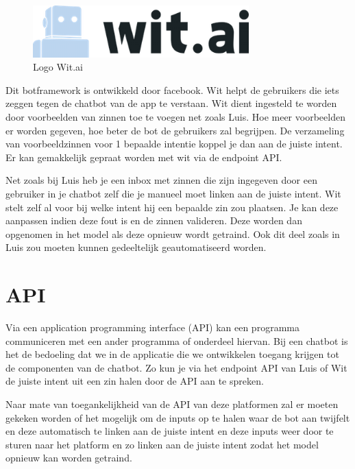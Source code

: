 \begin{figure}[h!]
	\centering
	\includegraphics[height=2cm]{wit.png}
	\caption{Logo Wit.ai ~\autocite{Eva2016}}
	\label{fig:wit}
\end{figure}

Dit botframework is ontwikkeld door facebook. Wit helpt de gebruikers die iets zeggen tegen de chatbot van de app te verstaan. Wit dient ingesteld te worden door voorbeelden van zinnen toe te voegen net zoals Luis. Hoe meer voorbeelden er worden gegeven, hoe beter de bot de gebruikers zal begrijpen. De verzameling van voorbeeldzinnen voor 1 bepaalde intentie koppel je dan aan de juiste intent. Er kan gemakkelijk gepraat worden met wit via de endpoint API. 

Net zoals bij Luis heb je een inbox met zinnen die zijn ingegeven door een gebruiker in je chatbot zelf die je manueel moet linken aan de juiste intent. Wit stelt zelf al voor bij welke intent hij een bepaalde zin zou plaatsen. Je kan deze aanpassen indien deze fout is en de zinnen valideren. Deze worden dan opgenomen in het model als deze opnieuw wordt getraind. Ook dit deel zoals in Luis zou moeten kunnen gedeeltelijk geautomatiseerd worden. ~\autocite{Wit2019}

\section{API}
\label{sec:API}

Via een application programming interface (API) kan een programma communiceren met een ander programma of onderdeel hiervan. Bij een chatbot is het de bedoeling dat we in de applicatie die we ontwikkelen toegang krijgen tot de componenten van de chatbot. Zo kun je via het endpoint API van Luis of Wit de juiste intent uit een zin halen door de API aan te spreken. 

Naar mate van toegankelijkheid van de API van deze platformen zal er moeten gekeken worden of het mogelijk om de inputs op te halen waar de bot aan twijfelt en deze automatisch te linken aan de juiste intent en deze inputs weer door te sturen naar het platform en zo linken aan de juiste intent zodat het model opnieuw kan worden getraind. ~\autocite{Kristian2011}     



